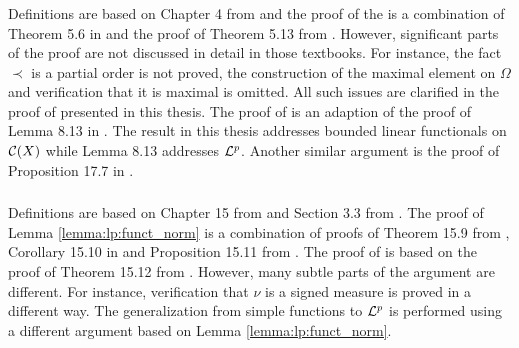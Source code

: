 \subsubsection{}
Definitions are based on Chapter 4 from \cite{rynne_2008_linear} and the proof of the  is a combination of Theorem 5.6 in \cite{folland_1999_real} and the proof of Theorem 5.13 from \cite{rynne_2008_linear}. However, significant parts of the proof are not discussed in detail in those textbooks. For instance, the fact $\prec$ is a partial order is not proved, the construction of the maximal element on $\Omega$ and verification that it is maximal is omitted. All such issues are clarified in the proof of  presented in this thesis. The proof of  is an adaption of the proof of Lemma 8.13 in \cite{bartle_measure_integration}. The result in this thesis addresses bounded linear functionals on ${\mathcal C}(X)$ while Lemma 8.13 addresses ${\mathcal {L}^p}$. Another similar argument is the proof of Proposition 17.7 in \cite{bass2011real}.

\subsubsection{}
Definitions are based on Chapter 15 from \cite{bass2011real} and Section 3.3 from \cite{cohn_2013_measure}. 
The proof of Lemma \ref{lemma:lp:funct_norm} is a combination of proofs of Theorem 15.9 from \cite{bass2011real}, Corollary 15.10 in \cite{bass2011real} and Proposition 15.11 from \cite{bass2011real}. The proof of  is based on the proof of Theorem 15.12 from \cite{bass2011real}. However, many subtle parts of the argument are different. For instance, verification that $\nu$ is a signed measure is proved in a different way. The generalization from simple functions to ${\mathcal {L}^p}$ is performed using a different argument based on Lemma \ref{lemma:lp:funct_norm}.

